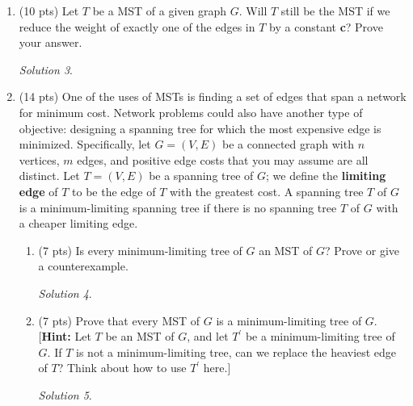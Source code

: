 \documentclass[12pt]{article}
\theoremstyle{remark}
\newtheorem*{solution}{Solution}
\begin{document}
\begin{enumerate}
\begin{enumerate}[label=(\alph*)]

\item (4 pts) In what order would Prim's algorithm add edges to the MST if we start at vertex $A$? 
\begin{solution}
(A,E),(E,F),(E,B),(F,G),(G,H),(G,C),(G,D)
\end{solution}
\pagebreak
\item (7 pts) In what order Kruskal's would add the edges to the MST? For each edge added by Kruskal's sequentially, give a cut that justifies it's addition. 
\begin{solution}

\end{solution}
 

\end{enumerate}

\pagebreak

\item (10 pts) Let $T$ be a MST of a given graph $G$. Will $T$ still be the MST if we reduce the weight of exactly one of the edges in $T$ by a constant \textbf{c}? Prove your answer.
\begin{solution}

\end{solution}

\pagebreak
\item (14 pts) One of the uses of MSTs is finding a set of edges that span a network for minimum cost. Network problems could also have another type of objective: designing a spanning tree for which the most expensive edge is minimized. Specifically, let $G = (V, E)$ be a connected graph with $n$ vertices, $m$ edges, and positive edge costs that you may assume are all distinct. Let $T = (V, E)$ be a spanning tree of $G$; we define the \textbf{limiting edge} of $T$ to be the edge of $T$ with the greatest cost.
A spanning tree $T$ of $G$ is a minimum-limiting spanning tree if there is no spanning tree $T$ of $G$ with a cheaper limiting edge.
\begin{enumerate}
\item (7 pts) Is every minimum-limiting tree of $G$ an MST of $G$? Prove or give a counterexample.
\begin{solution}

\end{solution}

\pagebreak
\item (7 pts) Prove that every MST of $G$ is a minimum-limiting tree of $G$. [\textbf{Hint:} Let $T$ be an MST of $G$, and let $T^{\prime}$ be a minimum-limiting tree of $G$. If $T$ is not a minimum-limiting tree, can we replace the heaviest edge of $T$? Think about how to use $T^{\prime}$ here.]

\begin{solution}

\end{solution}

\end{enumerate}

\end{enumerate}
\end{document}
